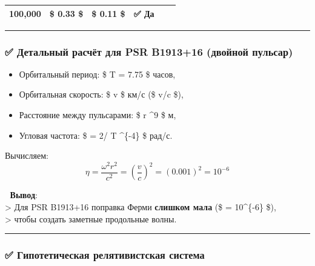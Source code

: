 \documentclass[11pt]{article}
\providecommand{\tightlist}{%
      \setlength{\itemsep}{0pt}\setlength{\parskip}{0pt}}
\begin{document}
\begin{longtable}[]{@{}llllll@{}}
\begin{minipage}[t]{0.14\columnwidth}
100,000\strut
\end{minipage} & \begin{minipage}[t]{0.09\columnwidth}\raggedright\strut
\$ 0.33 \$\strut
\end{minipage} & \begin{minipage}[t]{0.21\columnwidth}\raggedright\strut
\$ 0.11 \$\strut
\end{minipage} & \begin{minipage}[t]{0.19\columnwidth}\raggedright\strut
✅ Да\strut
\end{minipage}\tabularnewline
\bottomrule
\end{longtable}

\begin{center}\rule{0.5\linewidth}{\linethickness}\end{center}

\subsubsection{✅ Детальный расчёт для PSR B1913+16 (двойной
пульсар)}\label{ux434ux435ux442ux430ux43bux44cux43dux44bux439-ux440ux430ux441ux447ux451ux442-ux434ux43bux44f-psr-b191316-ux434ux432ux43eux439ux43dux43eux439-ux43fux443ux43bux44cux441ux430ux440}

\begin{itemize}
\tightlist
\item
  Орбитальный период: \$ T = 7.75 \$ часов,
\item
  Орбитальная скорость: \$ v  \$ км/с (\$ v/c 
  \$),
\item
  Расстояние между пульсарами: \$ r  \^{}9 \$ м,
\item
  Угловая частота: \$ \omega = 2\pi / T  \^{}\{-4\}
  \$ рад/с.
\end{itemize}

Вычисляем: \[
\eta = \frac{\omega^2 r^2}{c^2} = \left( \frac{v}{c} \right)^2 = (0.001)^2 = 10^{-6}
\]

📌 \textbf{Вывод}:\\
\textgreater{} Для PSR B1913+16 поправка Ферми \textbf{слишком мала} (\$
\eta = 10\^{}\{-6\} \$),\\
\textgreater{} чтобы создать заметные продольные волны.

\begin{center}\rule{0.5\linewidth}{\linethickness}\end{center}

\subsubsection{✅ Гипотетическая релятивистская
система}\label{ux433ux438ux43fux43eux442ux435ux442ux438ux447ux435ux441ux43aux430ux44f-ux440ux435ux43bux44fux442ux438ux432ux438ux441ux442ux441ux43aux430ux44f-ux441ux438ux441ux442ux435ux43cux430}
\end{document}
